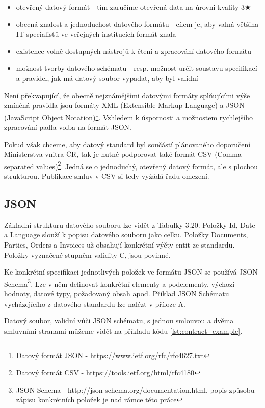 \begin{itemize}
\item otevřený datový formát - tím zaručíme otevřená data na úrovni kvality 3$\bigstar$
\item obecná znalost a jednoduchost datového formátu - cílem je, aby valná většina IT specialistů ve veřejných institucích formát znala
\item existence volně dostupných nástrojů k čtení a zpracování datového formátu
\item možnost tvorby datového schématu - resp. možnost určit soustavu specifikací a pravidel, jak má datový soubor vypadat, aby byl validní
\end{itemize}

Není překvapující, že obecně nejznámějšími datovými formáty splňujícími výše zmíněná pravidla jsou formáty XML (Extensible Markup Language) a JSON (JavaScript Object Notation)\footnote{Datový formát JSON - https://www.ietf.org/rfc/rfc4627.txt}. Vzhledem k úspornosti a možnostem rychlejšího zpracování padla volba na formát JSON.

Pokud však chceme, aby datový standard byl součástí plánovaného doporučení Ministerstva vnitra ČR, tak je nutné podporovat také formát CSV (Comma-separated values)\footnote{Datový formát CSV - https://tools.ietf.org/html/rfc4180}. Jedná se o jednoduchý, otevřený datový formát, ale s plochou strukturou. Publikace smluv v CSV si tedy vyžádá řadu omezení. 

\subsection{JSON}

Základní strukturu datového souboru lze vidět z Tabulky 3.20. Položky Id, Date a Language slouží k popisu datového souboru jako celku. Položky Documents, Parties, Orders a Invoices už obsahují konkrétní výčty entit ze standardu. Položky vyznačené stupněm validity C, jsou povinné.

Ke konkrétní specifikaci jednotlivých položek ve formátu JSON se používá JSON Schema\footnote{JSON Schema - http://json-schema.org/documentation.html, popis způsobu zápisu konkrétních položek je nad rámce této práce}. Lze v něm definovat konkrétní elementy a podelementy, výchozí hodnoty, datové typy, požadovaný obsah apod. Příklad JSON Schématu vycházejícího z datového standardu lze nalézt v příloze A.

Datový soubor, validní vůči JSON schématu, s jednou smlouvou a dvěma smluvními stranami můžeme vidět na příkladu kódu \ref{lst:contract_example}.

